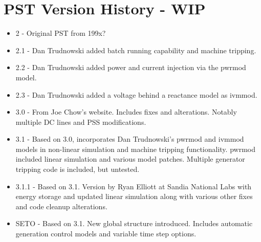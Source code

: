 \chapter{PST Version History - WIP}



\begin{itemize}
 em
\singlespacing
\item 2 - Original PST from 199x?
\item 2.1 - Dan Trudnowski added batch running capability and machine tripping.
\item 2.2 - Dan Trudnowski added power and current injection via the pwrmod model.
\item 2.3 - Dan Trudnowski added a voltage behind a reactance model as ivmmod.
\item 3.0 - From Joe Chow's website. 
Includes fixes and alterations. 
Notably multiple DC lines and PSS modifications.
\item 3.1 - Based on 3.0, incorporates Dan Trudnowski's pwrmod and ivmmod models in non-linear simulation and machine tripping functionality.
pwrmod included linear simulation and various model patches. 
Multiple generator tripping code is included, but untested.
\item 3.1.1 - Based on 3.1. Version by Ryan Elliott at Sandia National Labs with energy storage and updated linear simulation along with various other fixes and code cleanup alterations. 
\item SETO - Based on 3.1. New global structure introduced. 
Includes automatic generation control models and variable time step options. 



\end{itemize}
